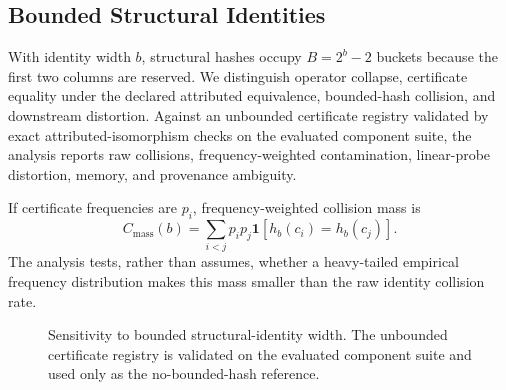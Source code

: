 \subsection{Bounded Structural Identities}

With identity width $b$, structural hashes occupy $B=2^b-2$ buckets because
the first two columns are reserved. We distinguish operator collapse,
certificate equality under the declared attributed equivalence, bounded-hash
collision, and downstream distortion. Against an unbounded certificate registry
validated by exact attributed-isomorphism checks on the evaluated component
suite, the analysis reports raw collisions, frequency-weighted contamination,
linear-probe distortion, memory, and provenance ambiguity.

If certificate frequencies are $p_i$, frequency-weighted collision mass is
\begin{equation}
 C_{\mathrm{mass}}(b)=\sum_{i<j}p_i p_j
 \mathbf{1}[h_b(c_i)=h_b(c_j)].
\end{equation}
The analysis tests, rather than assumes, whether a heavy-tailed empirical
frequency distribution makes this mass smaller than the raw identity collision
rate.

\begin{figure}[t]
  \centering
  \caption{Sensitivity to bounded structural-identity width. The unbounded
  certificate registry is validated on the evaluated component suite and used
  only as the no-bounded-hash reference.}
  \label{fig:appendix-hash-width}
\end{figure}
